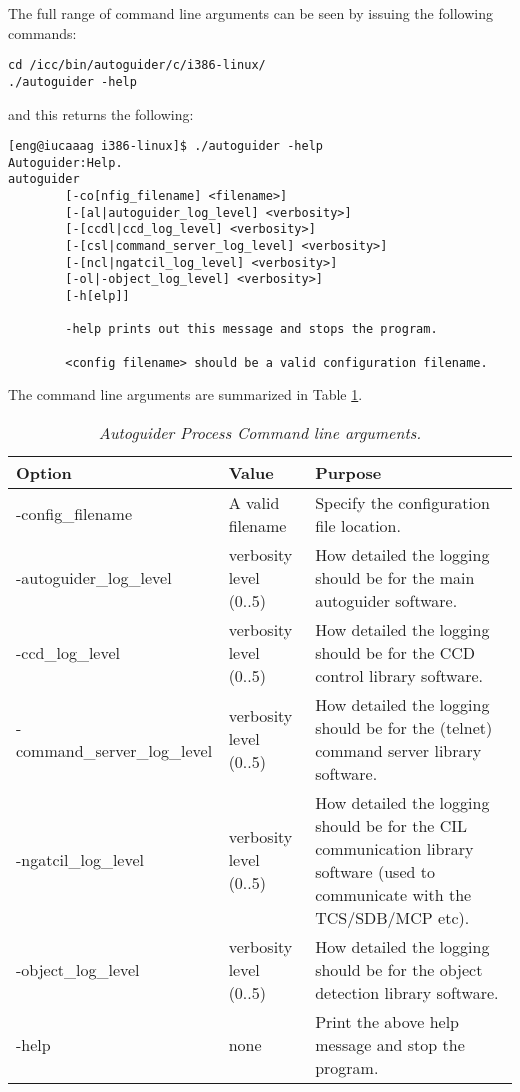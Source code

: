 \documentclass[10pt,a4paper]{article}
\begin{document}
The full range of command line arguments can be seen by issuing the following commands:

\begin{verbatim}
cd /icc/bin/autoguider/c/i386-linux/
./autoguider -help
\end{verbatim}

and this returns the following:

\begin{verbatim}
[eng@iucaaag i386-linux]$ ./autoguider -help
Autoguider:Help.
autoguider 
        [-co[nfig_filename] <filename>]
        [-[al|autoguider_log_level] <verbosity>]
        [-[ccdl|ccd_log_level] <verbosity>]
        [-[csl|command_server_log_level] <verbosity>]
        [-[ncl|ngatcil_log_level] <verbosity>]
        [-ol|-object_log_level] <verbosity>]
        [-h[elp]]

        -help prints out this message and stops the program.

        <config filename> should be a valid configuration filename.
\end{verbatim}

The command line arguments are summarized in Table \ref{tab:autoguiderprocesscommandlinearguments}.

\begin{table}[!h]
\begin{center}
\begin{tabular}{|l|l|p{20em}|}
\hline
{\bf Option} & {\bf Value} & {\bf Purpose} \\ \hline
-config\_filename & A valid filename & Specify the configuration file location. \\ \hline
-autoguider\_log\_level & verbosity level (0..5) & How detailed the logging should be for the main autoguider software. \\ \hline
-ccd\_log\_level & verbosity level (0..5) & How detailed the logging should be for the CCD control library software. \\ \hline
-command\_server\_log\_level & verbosity level (0..5) & How detailed the logging should be for the (telnet) command server library software. \\ \hline
-ngatcil\_log\_level & verbosity level (0..5) & How detailed the logging should be for the CIL communication library software (used to communicate with the TCS/SDB/MCP etc). \\ \hline
-object\_log\_level & verbosity level (0..5) & How detailed the logging should be for the object detection library software. \\ \hline
-help & none & Print the above help message and stop the program. \\ \hline
\end{tabular}
\end{center}
\caption{\em Autoguider Process Command line arguments.}
\label{tab:autoguiderprocesscommandlinearguments}
\end{table}
\end{document}

